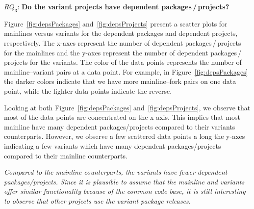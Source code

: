 
$RQ_3$: \textbf{Do the variant projects have dependent packages\,/\,projects?}

Figure~\ref{fig:depsPackages} and~\ref{fig:depsProjects} present a scatter plots for mainlines versus variants for the dependent packages and dependent projects, respectively.
The x-axes represent the number of dependent packages\,/\,projects for the mainlines and the y-axes represent the number of dependent packages\,/\,projects for the variants.
The color of the data points represents the number of mainline--variant pairs at a data point.
For example, in Figure~\ref{fig:depsPackages} the darker colors indicate that we have more mainline--fork pairs on one data point, while the lighter data points indicate the reverse.

Looking at both Figure~\ref{fig:depsPackages} and~\ref{fig:depsProjects}, we observe that most of the data points are concentrated on the x-axis. 
This implies that most mainline have many dependent packages/projects compared to their variants counterparts.
However, we observe a few scattered data points a long the y-axes indicating a few variants which have many dependent packages/projects compared to their mainline counterparts. 

\begin{framed}
\noindent
\emph{Compared to the mainline counterparts, the variants have fewer dependent packages/projects. Since it is plausible to assume that the mainline and variants offer similar functionality because of the common code base, it is still interesting to observe that other projects use the variant package releases.}
\end{framed}
